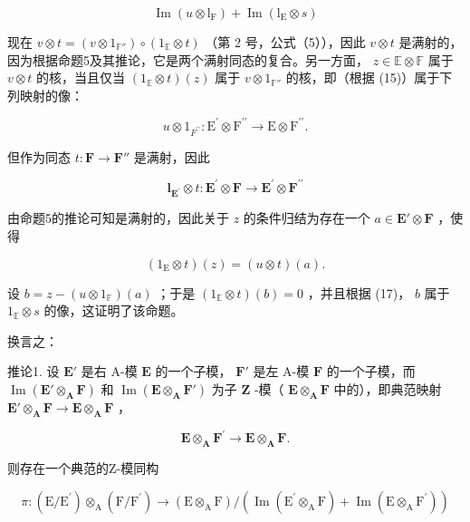 \[
\operatorname{Im} (u \otimes \mathrm{l} _ {\mathrm{F}}) + \operatorname{Im} (\mathrm{l} _ {\mathrm{E}} \otimes s)
\]

现在 \(v \otimes t = (v \otimes 1_{\mathbb{F}''}) \circ (1_{\mathbb{E}} \otimes t)\) （第 2 号，公式（5）），因此 \(v \otimes t\) 是满射的，因为根据命题5及其推论，它是两个满射同态的复合。另一方面， \(z \in \mathbb{E} \otimes \mathbb{F}\) 属于 \(v \otimes t\) 的核，当且仅当 \((1_{\mathbb{E}} \otimes t) (z)\) 属于 \(v \otimes 1_{\mathbb{F}''}\) 的核，即（根据 (15)）属于下列映射的像：

\[
u \otimes 1 _ {F ^ {\prime \prime}}: \mathrm{E} ^ {\prime} \otimes \mathrm{F} ^ {\prime \prime} \rightarrow \mathrm{E} \otimes \mathrm{F} ^ {\prime \prime}.
\]

但作为同态 \(t: \mathbf{F} \to \mathbf{F}''\) 是满射，因此

\[
\mathbf {l} _ {\mathbf {E} ^ {\prime}} \otimes t: \mathbf {E} ^ {\prime} \otimes \mathbf {F} \rightarrow \mathbf {E} ^ {\prime} \otimes \mathbf {F} ^ {\prime \prime}
\]

由命题5的推论可知是满射的，因此关于 \(z\) 的条件归结为存在一个 \(a \in \mathbf{E}' \otimes \mathbf{F}\) ，使得

\[
(1 _ {\mathrm{E}} \otimes t) (z) = (u \otimes t) (a).
\]

设 \(b = z - (u \otimes 1_{\mathbb{F}})(a)\) ；于是 \((1_{\mathbb{E}} \otimes t)(b) = 0\) ，并且根据 (17)， \(b\) 属于 \(1_{\mathbb{E}} \otimes s\) 的像，这证明了该命题。

换言之：

推论1. 设 \(\mathbf{E}'\) 是右 A-模 \(\mathbf{E}\) 的一个子模， \(\mathbf{F}'\) 是左 A-模 \(\mathbf{F}\) 的一个子模，而 \(\operatorname{Im}(\mathbf{E}' \otimes_{\mathbf{A}} \mathbf{F})\) 和 \(\operatorname{Im}(\mathbf{E} \otimes_{\mathbf{A}} \mathbf{F}')\) 为子 \(\mathbf{Z}\) -模（ \(\mathbf{E} \otimes_{\mathbf{A}} \mathbf{F}\) 中的），即典范映射 \(\mathbf{E}' \otimes_{\mathbf{A}} \mathbf{F} \to \mathbf{E} \otimes_{\mathbf{A}} \mathbf{F}\) ，

\[
\mathbf {E} \otimes_ {\mathbf {A}} \mathbf {F} ^ {\prime} \rightarrow \mathbf {E} \otimes_ {\mathbf {A}} \mathbf {F}.
\]

则存在一个典范的Z-模同构

\[
\pi : (\mathrm{E} / \mathrm{E} ^ {\prime}) \otimes_ {\mathrm{A}} (\mathrm{F} / \mathrm{F} ^ {\prime}) \rightarrow (\mathrm{E} \otimes_ {\mathrm{A}} \mathrm{F}) / (\operatorname{Im} (\mathrm{E} ^ {\prime} \otimes_ {\mathrm{A}} \mathrm{F}) + \operatorname{Im} (\mathrm{E} \otimes_ {\mathrm{A}} \mathrm{F} ^ {\prime}))\tag{20}
\]

